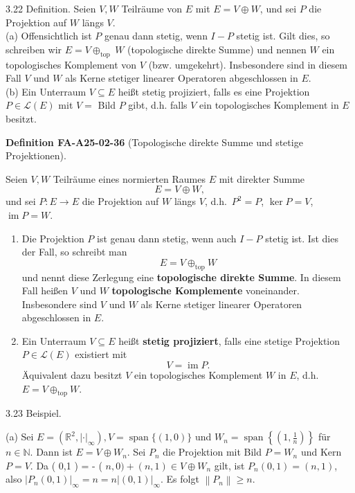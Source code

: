 \documentclass[10pt, letterpaper]{article}
\newcommand{\CustomHeading}[3]{%
  \par\medskip\noindent%
  \textbf{#1 #2} \textnormal{(#3)}.\enskip%
}
\newenvironment{DEF}[2]{\begin{unitbox}\CustomHeading{Definition}{#1}{#2}}{\end{unitbox}}
\begin{document}
3.22 Definition. Seien $V, W$ Teilräume von $E$ mit $E=V \oplus W$, und sei $P$ die Projektion auf $W$ längs $V$.\\

(a) Offensichtlich ist $P$ genau dann stetig, wenn $I-P$ stetig ist. Gilt dies, so schreiben wir $E=V \oplus_{\text {top }} W$ (topologische direkte Summe) und nennen $W$ ein topologisches Komplement von $V$ (bzw. umgekehrt). Insbesondere sind in diesem Fall $V$ und $W$ als Kerne stetiger linearer Operatoren abgeschlossen in $E$.\\

(b) Ein Unterraum $V \subseteq E$ heißt stetig projiziert, falls es eine Projektion $P \in \mathcal{L}(E)$ mit $V=$ Bild $P$ gibt, d.h. falls $V$ ein topologisches Komplement in $E$ besitzt.\\



\begin{DEF}{FA-A25-02-36}{Topologische direkte Summe und stetige Projektionen}
Seien $V, W$ Teilräume eines normierten Raumes $E$ mit direkter Summe 
\[
E = V \oplus W,
\]
und sei $P:E\to E$ die Projektion auf $W$ längs $V$, d.h.\ $P^2=P$, $\ker P=V$, $\operatorname{im}P=W$.

\begin{enumerate}[label=(\alph*)]
\item
Die Projektion $P$ ist genau dann stetig, wenn auch $I-P$ stetig ist. 
Ist dies der Fall, so schreibt man
\[
E = V \oplus_{\mathrm{top}} W
\]
und nennt diese Zerlegung eine \textbf{topologische direkte Summe}.
In diesem Fall heißen $V$ und $W$ \textbf{topologische Komplemente} voneinander.
Insbesondere sind $V$ und $W$ als Kerne stetiger linearer Operatoren abgeschlossen in $E$.

\item
Ein Unterraum $V \subseteq E$ heißt \textbf{stetig projiziert}, 
falls eine stetige Projektion $P \in \mathcal{L}(E)$ existiert mit
\[
V = \operatorname{im} P.
\]
Äquivalent dazu besitzt $V$ ein topologisches Komplement $W$ in $E$, 
d.h.\ $E = V \oplus_{\mathrm{top}} W$.
\end{enumerate}
\end{DEF}


3.23 Beispiel. 

(a) Sei $E=\left(\mathbb{R}^{2},|\cdot|_{\infty}\right), V=\operatorname{span}\{(1,0)\}$ und $W_{n}=\operatorname{span}\left\{\left(1, \frac{1}{n}\right)\right\}$ für $n \in \mathbb{N}$. Dann ist $E=V \oplus W_{n}$. Sei $P_{n}$ die Projektion mit Bild $P=W_{n}$ und Kern $P=V$. Da ( 0,1 ) = - ( $n, 0)+(n, 1) \in V \oplus W_{n}$ gilt, ist $P_{n}(0,1)=(n, 1)$, also $\left|P_{n}(0,1)\right|_{\infty}=n=n|(0,1)|_{\infty}$. Es folgt $\left\|P_{n}\right\| \geq n$.\\
\end{document}
